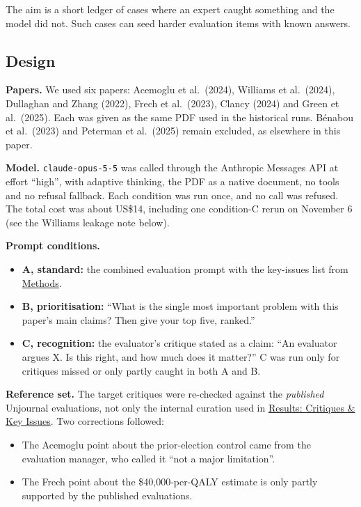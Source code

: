 \documentclass[
  11pt,
  letterpaper,
]{article}
\providecommand{\tightlist}{%
  \setlength{\itemsep}{0pt}\setlength{\parskip}{0pt}}
\begin{document}
The aim is a short ledger of cases where an expert caught something and
the model did not. Such cases can seed harder evaluation items with
known answers.

\subsection{Design}\label{design}

\textbf{Papers.} We used six papers: Acemoglu et al.~(2024), Williams et
al.~(2024), Dullaghan and Zhang (2022), Frech et al.~(2023), Clancy
(2024) and Green et al.~(2025). Each was given as the same PDF used in
the historical runs. Bénabou et al.~(2023) and Peterman et al.~(2025)
remain excluded, as elsewhere in this paper.

\textbf{Model.} \texttt{claude-opus-5-5} was called through the
Anthropic Messages API at effort ``high'', with adaptive thinking, the
PDF as a native document, no tools and no refusal fallback. Each
condition was run once, and no call was refused. The total cost was
about US\$14, including one condition-C rerun on November 6 (see the
Williams leakage note below).

\textbf{Prompt conditions.}

\begin{itemize}
\tightlist
\item
  \textbf{A, standard:} the combined evaluation prompt with the
  key-issues list from \hyperref[methods]{Methods}.
\item
  \textbf{B, prioritisation:} ``What is the single most important
  problem with this paper's main claims? Then give your top five,
  ranked.''
\item
  \textbf{C, recognition:} the evaluator's critique stated as a claim:
  ``An evaluator argues X. Is this right, and how much does it matter?''
  C was run only for critiques missed or only partly caught in both A
  and B.
\end{itemize}

\textbf{Reference set.} The target critiques were re-checked against the
\emph{published} Unjournal evaluations, not only the internal curation
used in \hyperref[results-critiques-key-issues]{Results: Critiques \&
Key Issues}. Two corrections followed:

\begin{itemize}
\tightlist
\item
  The Acemoglu point about the prior-election control came from the
  evaluation manager, who called it ``not a major limitation''.
\item
  The Frech point about the \$40,000-per-QALY estimate is only partly
  supported by the published evaluations.
\end{itemize}
\end{document}

